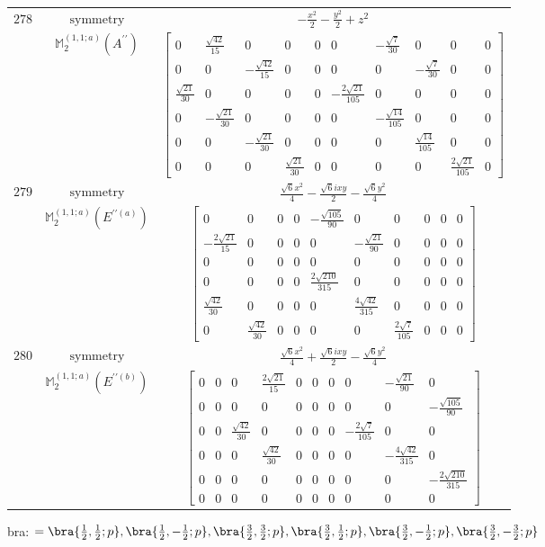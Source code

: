 \documentclass[fleqn,8pt,landscape]{jsarticle}
\begin{document}
\begin{longtable}{ccc}
$ 278 $ & $ \text{symmetry} $ & $ - \frac{x^{2}}{2} - \frac{y^{2}}{2} + z^{2} $ \\
$  $ & $ \mathbb{M}_{2}^{(1,1;a)}(A^{\prime\prime}) $ & $ \begin{bmatrix} 0 & \frac{\sqrt{42}}{15} & 0 & 0 & 0 & 0 & - \frac{\sqrt{7}}{30} & 0 & 0 & 0 \\ 0 & 0 & - \frac{\sqrt{42}}{15} & 0 & 0 & 0 & 0 & - \frac{\sqrt{7}}{30} & 0 & 0 \\ \frac{\sqrt{21}}{30} & 0 & 0 & 0 & 0 & - \frac{2 \sqrt{21}}{105} & 0 & 0 & 0 & 0 \\ 0 & - \frac{\sqrt{21}}{30} & 0 & 0 & 0 & 0 & - \frac{\sqrt{14}}{105} & 0 & 0 & 0 \\ 0 & 0 & - \frac{\sqrt{21}}{30} & 0 & 0 & 0 & 0 & \frac{\sqrt{14}}{105} & 0 & 0 \\ 0 & 0 & 0 & \frac{\sqrt{21}}{30} & 0 & 0 & 0 & 0 & \frac{2 \sqrt{21}}{105} & 0 \end{bmatrix} $ \\ \hline
$ 279 $ & $ \text{symmetry} $ & $ \frac{\sqrt{6} x^{2}}{4} - \frac{\sqrt{6} i x y}{2} - \frac{\sqrt{6} y^{2}}{4} $ \\
$  $ & $ \mathbb{M}_{2}^{(1,1;a)}(E^{\prime\prime(a)}) $ & $ \begin{bmatrix} 0 & 0 & 0 & 0 & - \frac{\sqrt{105}}{90} & 0 & 0 & 0 & 0 & 0 \\ - \frac{2 \sqrt{21}}{15} & 0 & 0 & 0 & 0 & - \frac{\sqrt{21}}{90} & 0 & 0 & 0 & 0 \\ 0 & 0 & 0 & 0 & 0 & 0 & 0 & 0 & 0 & 0 \\ 0 & 0 & 0 & 0 & \frac{2 \sqrt{210}}{315} & 0 & 0 & 0 & 0 & 0 \\ \frac{\sqrt{42}}{30} & 0 & 0 & 0 & 0 & \frac{4 \sqrt{42}}{315} & 0 & 0 & 0 & 0 \\ 0 & \frac{\sqrt{42}}{30} & 0 & 0 & 0 & 0 & \frac{2 \sqrt{7}}{105} & 0 & 0 & 0 \end{bmatrix} $ \\ \hline
$ 280 $ & $ \text{symmetry} $ & $ \frac{\sqrt{6} x^{2}}{4} + \frac{\sqrt{6} i x y}{2} - \frac{\sqrt{6} y^{2}}{4} $ \\
$  $ & $ \mathbb{M}_{2}^{(1,1;a)}(E^{\prime\prime(b)}) $ & $ \begin{bmatrix} 0 & 0 & 0 & \frac{2 \sqrt{21}}{15} & 0 & 0 & 0 & 0 & - \frac{\sqrt{21}}{90} & 0 \\ 0 & 0 & 0 & 0 & 0 & 0 & 0 & 0 & 0 & - \frac{\sqrt{105}}{90} \\ 0 & 0 & \frac{\sqrt{42}}{30} & 0 & 0 & 0 & 0 & - \frac{2 \sqrt{7}}{105} & 0 & 0 \\ 0 & 0 & 0 & \frac{\sqrt{42}}{30} & 0 & 0 & 0 & 0 & - \frac{4 \sqrt{42}}{315} & 0 \\ 0 & 0 & 0 & 0 & 0 & 0 & 0 & 0 & 0 & - \frac{2 \sqrt{210}}{315} \\ 0 & 0 & 0 & 0 & 0 & 0 & 0 & 0 & 0 & 0 \end{bmatrix} $ \\ \hline
\end{longtable}
bra: $=\bra{\frac{1}{2},\frac{1}{2};p}, \bra{\frac{1}{2},- \frac{1}{2};p}, \bra{\frac{3}{2},\frac{3}{2};p}, \bra{\frac{3}{2},\frac{1}{2};p}, \bra{\frac{3}{2},- \frac{1}{2};p}, \bra{\frac{3}{2},- \frac{3}{2};p}$
\end{document}
